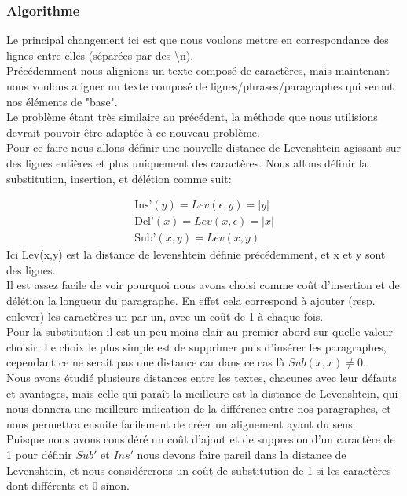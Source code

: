 \documentclass{article}
\begin{document}
\subsubsection{Algorithme}
Le principal changement ici est que nous voulons mettre en correspondance des
lignes entre elles (séparées par des \textbackslash{}n).\\
Précédemment nous alignions un texte composé de caractères, mais maintenant nous
voulons aligner un texte composé de lignes/phrases/paragraphes qui seront nos
éléments de "base".\\

Le problème étant très similaire au précédent, la méthode que nous utilisions
devrait pouvoir être adaptée à ce nouveau problème.\\
Pour ce faire nous allons définir une nouvelle distance de Levenshtein agissant sur
des lignes entières et plus uniquement des caractères.
Nous allons définir la substitution, insertion, et délétion comme suit:

\begin{gather*}
	\text{Ins'}(y) = Lev(\epsilon,y) = \lvert y \rvert\\
	\text{Del'}(x) = Lev(x,\epsilon) = \lvert x \rvert\\
	\text{Sub'}(x,y) = Lev(x,y)
\end{gather*}
Ici Lev(x,y) est la distance de levenshtein définie précédemment, et x et y
sont des lignes.\\

Il est assez facile de voir pourquoi nous avons choisi comme coût d'insertion
et de délétion la longueur du paragraphe. En effet cela correspond à ajouter
(resp. enlever) les caractères un par un, avec un coût de 1 à chaque fois.\\

Pour la substitution il est un peu moins clair au premier abord sur quelle
valeur choisir. Le choix le plus simple est de supprimer puis d'insérer les
paragraphes, cependant ce ne serait pas une distance car dans ce cas là
$Sub(x,x) \neq 0$.\\
Nous avons étudié plusieurs distances entre les textes, chacunes avec leur
défauts et avantages, mais celle qui paraît la meilleure est la distance de
Levenshtein, qui nous donnera une meilleure indication de la différence entre
nos paragraphes, et nous permettra ensuite facilement de créer un alignement
ayant du sens.\\
Puisque nous avons considéré un coût d'ajout et de suppresion d'un caractère de
1 pour définir $Sub'$ et $Ins'$ nous devons faire pareil dans la distance de
Levenshtein, et nous considérerons un coût de substitution de 1 si les
caractères dont différents et 0 sinon.\\
\end{document}
